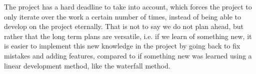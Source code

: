 The project has a hard deadline to take into account, which forces the project to only iterate over the work a certain number of times, instead of being able to develop on the project eternally.
That is not to say we do not plan ahead, but rather that the long term plans are versatile, i.e. if we learn of something new, it is easier to implement this new knowledge in the project by going back to fix mistakes and adding features, compared to if something new was learned using a linear development method, like the waterfall method.

